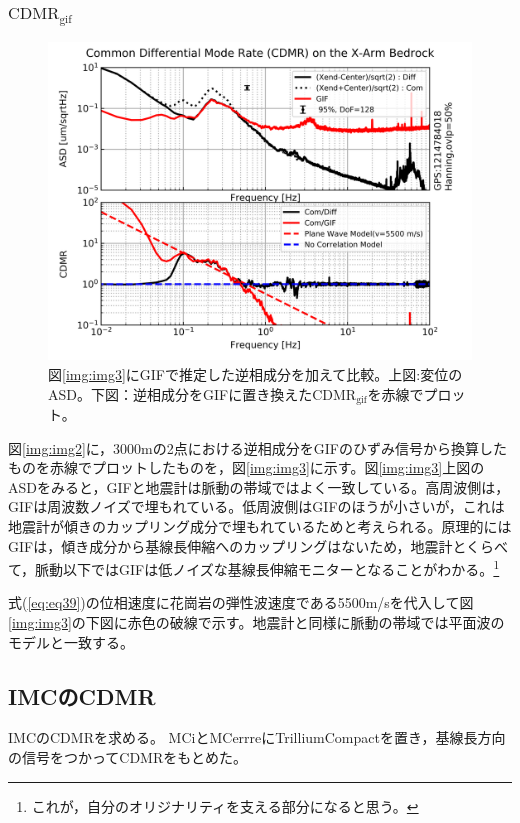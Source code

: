 \subsubsection{$\mathrm{CDMR_{gif}}$}
\begin{figure}[H]
  \begin{center}
    \includegraphics[width=11.5cm]{./img_cdmr_xarm_gif.png}
  \end{center}
  \caption{図\ref{img:img3}にGIFで推定した逆相成分を加えて比較。上図:変位のASD。下図：逆相成分をGIFに置き換えた$\mathrm{CDMR_{gif}}$を赤線でプロット。
  }\label{img:img4}
\end{figure}


図\ref{img:img2}に，3000mの2点における逆相成分をGIFのひずみ信号から換算したものを赤線でプロットしたものを，図\ref{img:img3}に示す。図\ref{img:img3}上図のASDをみると，GIFと地震計は脈動の帯域ではよく一致している。高周波側は，GIFは周波数ノイズで埋もれている。低周波側はGIFのほうが小さいが，これは地震計が傾きのカップリング成分で埋もれているためと考えられる。原理的にはGIFは，傾き成分から基線長伸縮へのカップリングはないため，地震計とくらべて，脈動以下ではGIFは低ノイズな基線長伸縮モニターとなることがわかる。\footnote[11]{これが，自分のオリジナリティを支える部分になると思う。}

式(\ref{eq:eq39})の位相速度に花崗岩の弾性波速度である5500m/sを代入して図\ref{img:img3}の下図に赤色の破線で示す。地震計と同様に脈動の帯域では平面波のモデルと一致する。


\subsection{IMCのCDMR}
IMCのCDMRを求める。%
MCiとMCerrreにTrilliumCompactを置き，基線長方向の信号をつかってCDMRをもとめた。


